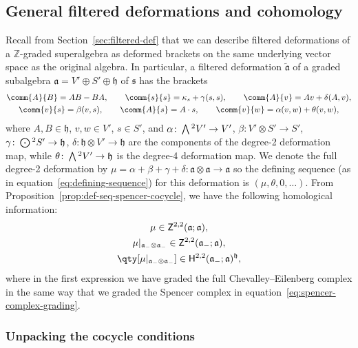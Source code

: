 \documentclass[10pt,a4paper]{amsart}
\numberwithin{equation}{section}
\newcommand{\fa}{\mathfrak{a}}
\newcommand{\fh}{\mathfrak{h}}
\newcommand{\fs}{\mathfrak{s}}
\newcommand{\ZZ}{\mathbb{Z}}
\newcommand{\ssH}{\mathsf{H}}
\newcommand{\ssZ}{\mathsf{Z}}
\newcommand{\fatilde}{\widetilde{\fa}}
\newcommand{\Wedge}{\mathchoice{{\textstyle\bigwedge}}{\bigwedge}{\bigwedge}{\bigwedge}}	%
\newcommand{\Odot}{\mathchoice{{\textstyle\bigodot}}{\bigodot}{\bigodot}{\bigodot}}
\newcommand{\1}{\mathbbm{1}}
\begin{document}
\subsection{General filtered deformations and cohomology}
\label{sec:filtered-def-cohom}

Recall from Section~\ref{sec:filtered-def} that we can describe filtered deformations of a $\ZZ$-graded superalgebra as deformed brackets on the same underlying vector space as the original algebra. In particular, a filtered deformation $\fatilde$ of a graded subalgebra $\fa=V'\oplus S'\oplus \fh$ of $\fs$ has the brackets
\begin{gather}
	\comm{A}{B} = AB-BA,\qquad
	\comm{s}{s} = \kappa_s + \gamma(s,s),\qquad
	\comm{A}{v} = Av + \delta(A,v),
	\nonumber\\
	\comm{v}{s} = \beta(v,s),\qquad\comm{A}{s} = A\cdot s
	, \qquad\comm{v}{w} = \alpha(v,w) + \theta(v,w),\label{eq:def-brackets-general}
\end{gather}
where $A,B\in\fh$, $v,w\in V'$, $s\in S'$, and
$\alpha\colon \Wedge^2V' \to V'$, $
	\beta\colon V'\otimes S' \to S'$, $
	\gamma\colon \Odot^2 S' \to \fh$, $
	\delta\colon \fh\otimes V' \to \fh
$
are the components of the degree-2 deformation map, while
$\theta\colon \Wedge^2 V' \to \fh
$
is the degree-4 deformation map. We denote the full degree-2 deformation by
${\mu=\alpha+\beta+\gamma+\delta\colon \fa\otimes\fa \to \fa}
$
so the defining sequence (as in equation~\eqref{eq:defining-sequence}) for this deformation is $(\mu,\theta,0,\dots)$. From Proposition~\ref{prop:def-seq-spencer-cocycle}, we have the following homological information:
\begin{gather}
	\mu \in \ssZ^{2,2}(\fa;\fa),	\label{eq:mu-CE-cocycle}	\\
	\mu|_{\fa_-\otimes\fa_-} \in \ssZ^{2,2}(\fa_-;\fa),	\label{eq:mu-spencer-cocycle}	\\
	\qty[\mu|_{\fa_-\otimes\fa_-}] \in \ssH^{2,2}(\fa_-;\fa)^\fh, \label{eq:mu-invt-class}
\end{gather}
where in the first expression we have graded the full Chevalley--Eilenberg complex in the same way that we graded the Spencer complex in equation~\eqref{eq:spencer-complex-grading}.

\subsubsection{Unpacking the cocycle conditions}
\end{document}
